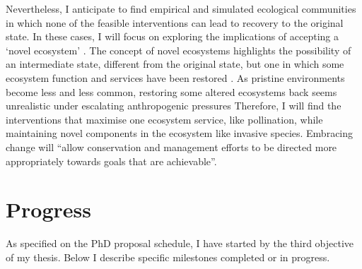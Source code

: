 \documentclass[a4paper]{article}
\begin{document}
Nevertheless, I anticipate to find empirical and simulated ecological communities in which none of the feasible interventions can lead to recovery to the original state.
In these cases, I will focus on exploring the implications of accepting a `novel ecosystem' \autocite{Hobbs2006}.
The concept of novel ecosystems highlights the possibility of an intermediate state, different from the original state, but one in which some ecosystem function and services have been restored \autocite{Graham2014a, Graham2015a}.
As pristine environments become less and less common, restoring some altered ecosystems back seems unrealistic under escalating anthropogenic pressures \autocite{Graham2015a}
Therefore, I will find the interventions that maximise one ecosystem service, like pollination, while maintaining novel components in the ecosystem like invasive species.
Embracing change will ``allow conservation and management efforts to be directed more appropriately towards goals that are achievable''\autocite{Graham2014a}.


\section*{Progress}

As specified on the PhD proposal schedule, I have started by the third objective of my thesis.  Below I describe specific milestones completed or in progress.
\end{document}
